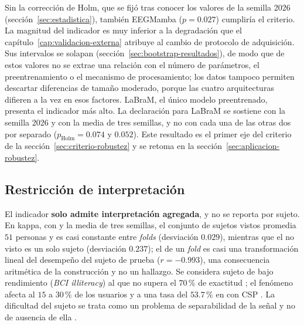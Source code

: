 Sin la corrección de Holm, que se fijó tras conocer los valores de la semilla 2026
(sección~\ref{sec:estadistica}), también EEGMamba ($p = 0.027$) cumpliría el criterio. La magnitud
del indicador es muy inferior a la degradación que el
capítulo~\ref{cap:validacion-externa} atribuye al cambio de protocolo de adquisición. Sus
intervalos se solapan (sección~\ref{sec:bootstrap-resultados}), de modo que de estos valores no se
extrae una relación con el número de parámetros, el preentrenamiento o el mecanismo de procesamiento;
los datos tampoco permiten descartar diferencias de tamaño moderado, porque las cuatro arquitecturas
difieren a la vez en esos factores. LaBraM, el único modelo preentrenado, presenta el indicador más
alto. La declaración para LaBraM se sostiene con la semilla 2026 y con la media de tres semillas, y no
con cada una de las otras dos por separado ($p_{\text{Holm}} = 0.074$ y $0.052$). Este resultado es
el primer eje del criterio de la sección~\ref{sec:criterio-robustez} y se retoma en la
sección~\ref{sec:aplicacion-robustez}.

\subsection{Restricción de interpretación}

El indicador \textbf{solo admite interpretación agregada}, y no se reporta por sujeto. En kappa, con
\eegnet{} y la media de tres semillas, el conjunto de sujetos vistos promedia $51$ personas y es casi
constante entre \textit{folds} (desviación $0.029$), mientras que el no visto es un solo sujeto
(desviación $0.237$); el \dsi{} de un \textit{fold} es casi una transformación lineal del desempeño
del sujeto de prueba ($r = -0.993$), una consecuencia aritmética de la construcción y no un hallazgo.
Se considera sujeto de bajo rendimiento (\textit{BCI illiteracy}) al que no supera el $70$\,\% de
exactitud \cite{kubler2004,vidaurre2010}; el fenómeno afecta al $15$ a $30$\,\% de los usuarios
\cite{vidaurre2010,blankertz2010} y a una tasa del $53.7$\,\% en \openbmi{} con CSP
\cite{lee2019}. La dificultad del sujeto se trata como un problema de separabilidad de la señal y
no de ausencia de ella \cite{huang2023discrepancy}.

